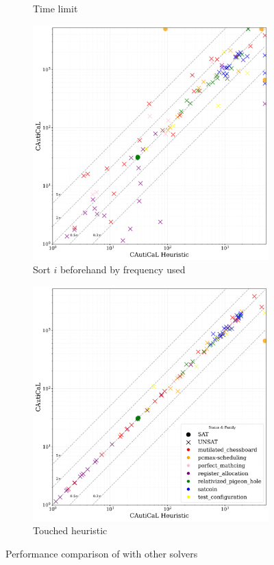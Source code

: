 \begin{figure}[!t]
\begin{subfigure}[t]{0.3\textwidth}
        \caption{Time limit}
        \label{fig:global-time-limit}
    \end{subfigure}
    \begin{subfigure}[t]{0.3\textwidth}
        \centering
        \includegraphics[width=\textwidth]{figs/globalisort_heuristic_comparison.jpg}
        \caption{Sort $i$ beforehand by frequency used}
        \label{fig:global-sort-i}
    \end{subfigure}
    \begin{subfigure}[t]{0.3\textwidth}
        \centering
        \includegraphics[width=\textwidth]{figs/globaltouch_heuristic_comparison.jpg}
        \caption{Touched heuristic}
        \label{fig:global-touched}
    \end{subfigure}
    \caption{Performance comparison of \tool with other solvers}
\end{figure}